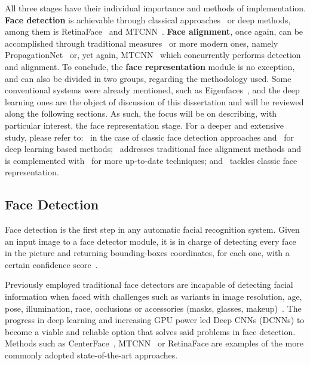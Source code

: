 \documentclass[class=report, crop=false, a4paper, 12pt]{standalone}
\begin{document}
\par All three stages have their individual importance and methods of implementation. \textbf{Face detection} is achievable through classical approaches~\autocite{violaRapidObjectDetection2001, brubakerDesignCascadesBoosted2008} or deep methods, among them is RetinaFace~\autocite{dengRetinaFaceSinglestageDense2019} and MTCNN~\autocite{zhangJointFaceDetection2016a}. \textbf{Face alignment}, once again, can be accomplished through traditional measures~\autocite{cootesViewbasedActiveAppearance2002, martinezLocalEvidenceAggregation2013} or more modern ones, namely PropagationNet~\autocite{huangPropagationNetPropagatePoints2020} or, yet again, MTCNN~\autocite{zhangJointFaceDetection2016a} which concurrently performs detection and alignment. To conclude, the \textbf{face representation} module is no exception, and can also be divided in two groups, regarding the methodology used. Some conventional systems were already mentioned, such as Eigenfaces~\autocite{p.n.belhumeurEigenfacesVsFisherfaces1997,turkEigenfacesRecognition1991}, and the deep learning ones are the object of discussion of this dissertation and will be reviewed along the following sections. As such, the focus will be on describing, with particular interest, the face representation stage. For a deeper and extensive study, please refer to:~\autocite{zafeiriouSurveyFaceDetection2015} in the case of classic face detection approaches and~\autocite{minaeeGoingDeeperFace2021} for deep learning based methods;~\autocite{wangFacialFeaturePoint2018} addresses traditional face alignment methods and is complemented with~\autocite{duElementsEndtoendDeep2022} for more up-to-date techniques; and~\autocite{learned-millerLabeledFacesWild2016} tackles classic face representation.

\subsection{Face Detection}
\par Face detection is the first step in any automatic facial recognition system. Given an input image to a face detector module, it is in charge of detecting every face in the picture and returning bounding-boxes coordinates, for each one, with a certain confidence score~\autocite{duElementsEndtoendDeep2022,ranjanDeepLearningUnderstanding2018}.

\par Previously employed traditional face detectors are incapable of detecting facial information when faced with challenges such as variants in image resolution, age, pose, illumination, race, occlusions or accessories (masks, glasses, makeup)~\autocite{duElementsEndtoendDeep2022,ranjanDeepLearningUnderstanding2018}. The progress in deep learning and increasing GPU power led Deep CNNs (DCNNs) to become a viable and reliable option that solves said problems in face detection. Methods such as CenterFace~\autocite{xuCenterFaceJointFace2019}, MTCNN~\autocite{zhangJointFaceDetection2016a} or RetinaFace\autocite{dengRetinaFaceSinglestageDense2019} are examples of the more commonly adopted state-of-the-art approaches.
\end{document}

